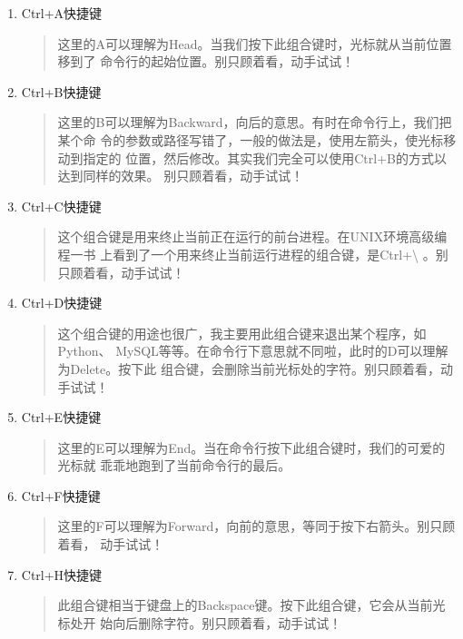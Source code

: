 \begin{enumerate}[itemsep=0pt,parsep=0pt]
	\item Ctrl+A快捷键
  \begin{quote}
    这里的A可以理解为Head。当我们按下此组合键时，光标就从当前位置移到了
    命令行的起始位置。别只顾着看，动手试试！
  \end{quote}

\item Ctrl+B快捷键
  \begin{quote}
    这里的B可以理解为Backward，向后的意思。有时在命令行上，我们把某个命
    令的参数或路径写错了，一般的做法是，使用左箭头，使光标移动到指定的
    位置，然后修改。其实我们完全可以使用Ctrl+B的方式以达到同样的效果。
    别只顾着看，动手试试！
  \end{quote}

\item Ctrl+C快捷键
  \begin{quote}
    这个组合键是用来终止当前正在运行的前台进程。在UNIX环境高级编程一书
    上看到了一个用来终止当前运行进程的组合键，是Ctrl+\textbackslash
    \cite{unixenvironment}。别只顾着看，动手试试！
  \end{quote}

\item Ctrl+D快捷键
  \begin{quote}
    这个组合键的用途也很广，我主要用此组合键来退出某个程序，如Python、
    MySQL等等。在命令行下意思就不同啦，此时的D可以理解为Delete。按下此
    组合键，会删除当前光标处的字符。别只顾着看，动手试试！
  \end{quote}

\item Ctrl+E快捷键
  \begin{quote}
    这里的E可以理解为End。当在命令行按下此组合键时，我们的可爱的光标就
    乖乖地跑到了当前命令行的最后。
  \end{quote}

\item Ctrl+F快捷键
  \begin{quote}
    这里的F可以理解为Forward，向前的意思，等同于按下右箭头。别只顾着看，
    动手试试！
  \end{quote}

\item Ctrl+H快捷键
  \begin{quote}
    此组合键相当于键盘上的Backspace键。按下此组合键，它会从当前光标处开
    始向后删除字符。别只顾着看，动手试试！
  \end{quote}


\end{enumerate}
